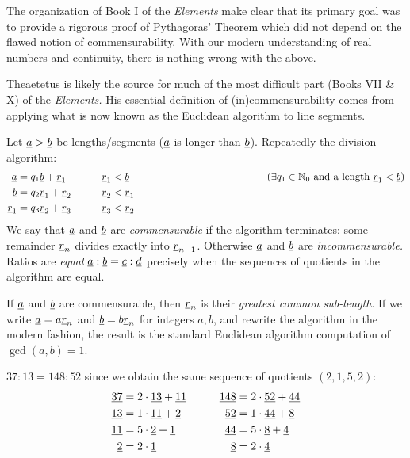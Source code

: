 The organization of Book I of the \emph{Elements} make clear that its primary goal was to provide a rigorous proof of Pythagoras' Theorem which did not depend on the flawed notion of commensurability. With our modern understanding of real numbers and continuity, there is nothing wrong with the above.%




\def\ul{\underline}

Theaetetus is likely the source for much of the most difficult part (Books VII \& X) of the \emph{Elements.} His essential definition of (in)commensurability comes from applying what is now known as the Euclidean algorithm to line segments. 

\begin{defn*}{}{}
	Let $\ul a>\ul b$ be lengths/segments\footnotemark{} ($\ul a$ is longer than $\ul b$). Repeatedly the division algorithm: 
	\begin{align*}
		\ul a&=q_1\ul b+\ul r_1\qquad &&\ul r_1<\ul b&&\hspace*{100pt}\tag{$\exists q_1\in\N_0$ and a length $\ul r_1<\ul b$}\\
		\ul b&=q_2\ul r_1+\ul r_2\qquad &&\ul r_2<\ul r_1\\
		\ul r_1&=q_3\ul r_2+\ul r_3\qquad &&\ul r_3<\ul r_2
	\end{align*}
	We say that $\ul a$ and $\ul b$ are \emph{commensurable} if the algorithm terminates: some remainder $\ul r_n$ divides exactly into $\ul r_{n-1}$. Otherwise $\ul a$ and $\ul b$ are \emph{incommensurable.}\smallbreak
	Ratios are \emph{equal} $\ul a:\ul b=\ul c:\ul d$ precisely when the sequences of quotients in the algorithm are equal.
\end{defn*}


If $\ul a$ and $\ul b$ are commensurable, then $\ul r_n$ is their \emph{greatest common sub-length}. If we write $\ul a=a\ul r_n$ and $\ul b=b\ul r_n$ for integers $a,b$, and rewrite the algorithm in the modern fashion, the result is the standard Euclidean algorithm computation of $\gcd(a,b)=1$.

$37:13=148:52$ since we obtain the same sequence of quotients $(2,1,5,2)$:
\begin{align*}
	\ul{37}&=2\cdot\ul{13}+\ul{11}\qquad &\ul{148}&=2\cdot\ul{52}+\ul{44}\\
	\ul{13}&=1\cdot\ul{11}+\ul{2}\qquad &\ul{52}&=1\cdot\ul{44}+\ul{8}\\
	\ul{11}&=5\cdot\ul{2}+\ul{1}\qquad &\ul{44}&=5\cdot\ul{8}+\ul{4}\\
	\ul{2}&=2\cdot\ul{1}\qquad &\ul{8}&=2\cdot\ul{4}
\end{align*}

